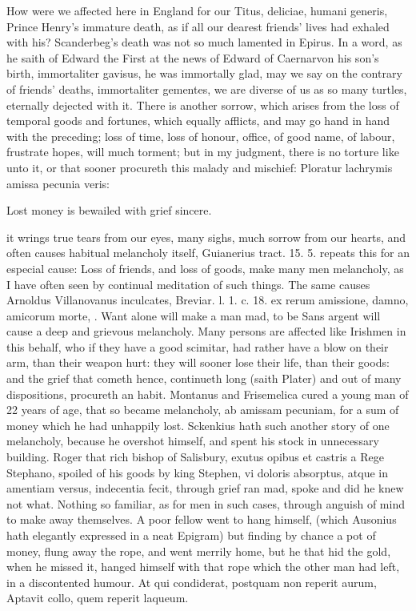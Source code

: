 {How were we affected here in England for our Titus, deliciae, humani
generis, Prince Henry's immature death, as if all our dearest friends'
lives had exhaled with his? Scanderbeg's death was not so much
lamented in Epirus. In a word, as he saith of Edward the First at
the news of Edward of Caernarvon his son's birth, immortaliter gavisus,
he was immortally glad, may we say on the contrary of friends' deaths,
immortaliter gementes, we are diverse of us as so many turtles,
eternally dejected with it.
There is another sorrow, which arises from the loss of temporal goods
and fortunes, which equally afflicts, and may go hand in hand with the
preceding; loss of time, loss of honour, office, of good name, of
labour, frustrate hopes, will much torment; but in my judgment, there
is no torture like unto it, or that sooner procureth this malady and
mischief:
Ploratur lachrymis amissa pecunia veris:

Lost money is bewailed with grief sincere.

it wrings true tears from our eyes, many sighs, much sorrow from our
hearts, and often causes habitual melancholy itself, Guianerius tract.
15. 5. repeats this for an especial cause: Loss of friends, and
loss of goods, make many men melancholy, as I have often seen by
continual meditation of such things. The same causes Arnoldus
Villanovanus inculcates, Breviar. l. 1. c. 18. ex rerum amissione,
damno, amicorum morte, \etc{}. Want alone will make a man mad, to be Sans
argent will cause a deep and grievous melancholy. Many persons are
affected like  Irishmen in this behalf, who if they have a good
scimitar, had rather have a blow on their arm, than their weapon hurt:
they will sooner lose their life, than their goods: and the grief that
cometh hence, continueth long (saith Plater) and out of many
dispositions, procureth an habit. Montanus and Frisemelica cured
a young man of 22 years of age, that so became melancholy, ab amissam
pecuniam, for a sum of money which he had unhappily lost. Sckenkius
hath such another story of one melancholy, because he overshot himself,
and spent his stock in unnecessary building. Roger that rich
bishop of Salisbury, exutus opibus et castris a Rege Stephano, spoiled
of his goods by king Stephen, vi doloris absorptus, atque in amentiam
versus, indecentia fecit, through grief ran mad, spoke and did he knew
not what. Nothing so familiar, as for men in such cases, through
anguish of mind to make away themselves. A poor fellow went to hang
himself, (which Ausonius hath elegantly expressed in a neat
Epigram) but finding by chance a pot of money, flung away the
rope, and went merrily home, but he that hid the gold, when he missed
it, hanged himself with that rope which the other man had left, in a
discontented humour.
At qui condiderat, postquam non reperit aurum,
Aptavit collo, quem reperit laqueum.

}
